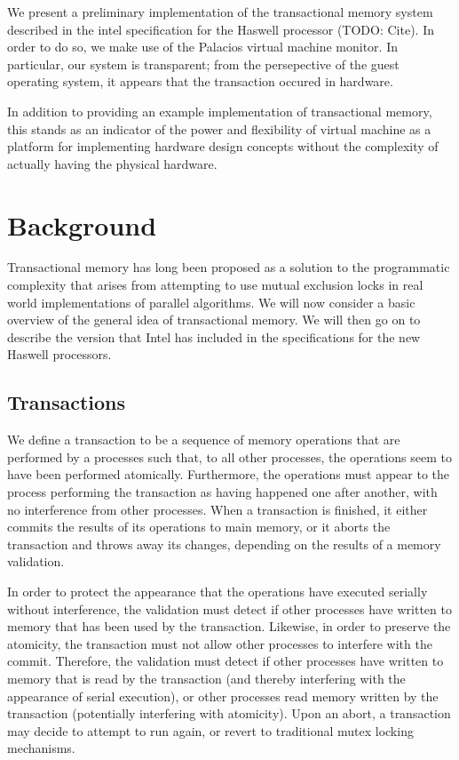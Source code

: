 \documentclass{acm_proc_article-sp}
\begin{document}
We present a preliminary implementation of the transactional memory system 
described in the intel specification for the Haswell processor (TODO: Cite).
In order to do so, we make use of the Palacios virtual machine monitor. In
particular, our system is transparent; from the persepective of the guest
operating system, it appears that the transaction occured in hardware. 

In addition to providing an example implementation of transactional memory,
this stands as an indicator of the power and flexibility of virtual machine
as a platform for implementing hardware design concepts without the complexity
of actually having the physical hardware.    

\section{Background}
Transactional memory has long been proposed as a solution to the programmatic 
complexity that arises from attempting to use mutual exclusion locks in real world 
implementations of parallel algorithms. We will now consider a basic overview 
of the general idea of transactional memory. We will then go on to describe the
 version that Intel has included in the specifications for the new Haswell 
processors.

\subsection{Transactions}
We define a transaction to be a sequence of memory operations that are 
performed by a processes such that, to all other processes, the operations 
seem to have been performed atomically. Furthermore, the operations must 
appear to the process performing the transaction as having happened one after 
another, with no interference from other processes. When a transaction is finished,
 it either commits the results of its operations to main memory, or it aborts 
the transaction and throws away its changes, depending on the results of a
memory validation.

In order to protect the appearance that the operations have executed serially
without interference, the validation must detect if other processes have 
written to memory that has been used by the transaction. Likewise, in order
to preserve the atomicity, the transaction must not allow other processes
to interfere with the commit. Therefore, the validation must detect if 
other processes have written to memory that is read by the transaction 
(and thereby interfering with the appearance of serial execution), or other 
processes read memory written by the transaction (potentially interfering
with atomicity). Upon an abort, a transaction may decide to attempt to run 
again, or revert to traditional mutex locking mechanisms.~\cite{Herlihy:1993:TMA:173682.165164}
\end{document}
